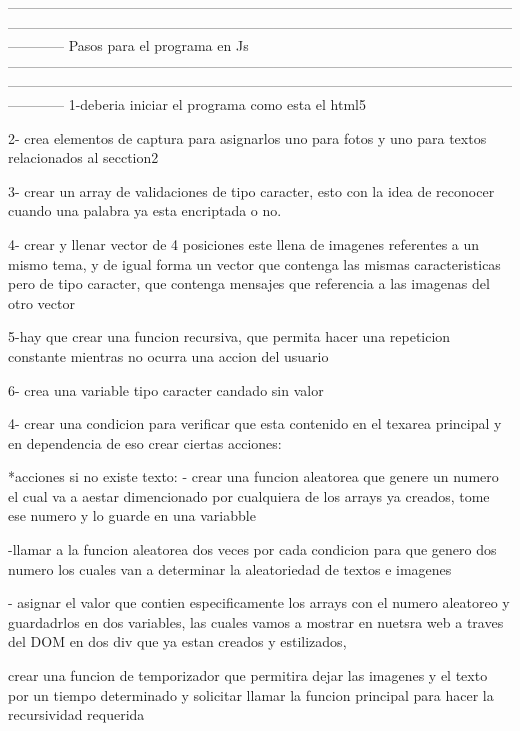   ------------------------------------------------------------------------------------------------------------------------------------------------------------------------------------------------------------------------------------
                                        Pasos para el programa en Js
  ------------------------------------------------------------------------------------------------------------------------------------------------------------------------------------------------------------------------------------
  1-deberia iniciar el programa como esta el html5

  2- crea elementos de captura para asignarlos uno para fotos y uno para textos relacionados al secction2

  3- crear un array de validaciones de tipo caracter, esto con la idea de reconocer cuando una palabra ya esta encriptada o no.

  4- crear y llenar vector de 4 posiciones  este llena de imagenes referentes a un mismo tema, y de igual 
  forma un vector que contenga las mismas caracteristicas pero de tipo caracter, que contenga mensajes que 
  referencia a las imagenas del otro vector 
  
  5-hay que crear una funcion recursiva, que permita hacer una repeticion constante mientras no ocurra una accion del usuario
  
  6- crea una variable tipo caracter candado sin valor
 
  4- crear una condicion para verificar que esta contenido en el texarea principal y en dependencia de eso crear ciertas acciones:
    
      *acciones si no existe texto:
         - crear una funcion aleatorea que genere un numero el cual va a aestar dimencionado por cualquiera de los arrays ya creados, tome ese numero 
         y lo guarde en una variabble

         -llamar a la funcion aleatorea dos veces por cada condicion para que genero dos numero los cuales van a determinar la aleatoriedad de textos e imagenes

         - asignar el valor que contien especificamente los arrays con el numero aleatoreo y guardadrlos en dos variables, las cuales vamos a mostrar en nuetsra 
         web a traves del DOM en dos div que ya estan creados y estilizados,

         crear una funcion de temporizador que permitira dejar las imagenes y el texto por un tiempo determinado y solicitar llamar la funcion principal para hacer la recursividad requerida

